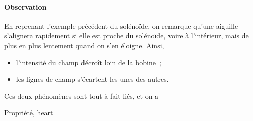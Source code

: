 \documentclass[../main/main.tex]{subfiles}
\begin{document}
\paragraph*{Observation}
En reprenant l'exemple précédent du solénoïde, on remarque qu'une aiguille
s'alignera rapidement si elle est proche du solénoïde, voire à l'intérieur, mais
de plus en plus lentement quand on s'en éloigne. Ainsi,
\begin{itemize}[label=$\diamond$, leftmargin=10pt]
  \item l'intensité du champ décroît loin de la bobine~;
  \item les lignes de champ s'écartent les unes des autres.
\end{itemize}
Ces deux phénomènes sont tout à fait liés, et on a
\begin{tprop}{Propriété, heart}
  \begin{center}
  \end{center}
\end{tprop}
\end{document}
